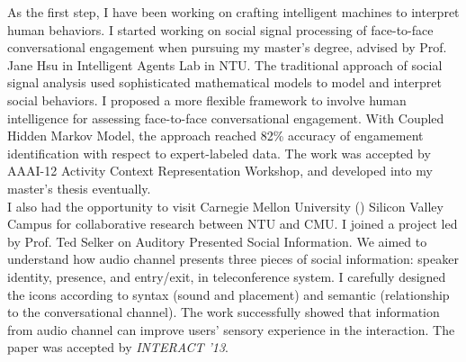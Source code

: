 \noindent
As the first step, 
I have been working on crafting intelligent machines to interpret human behaviors. 
I started working on social signal processing of face-to-face conversational engagement when pursuing my master's degree, 
advised by Prof. Jane Hsu in Intelligent Agents Lab in NTU. 
The traditional approach of social signal analysis used sophisticated mathematical models to model and interpret social behaviors. 
I proposed a more flexible framework to involve human intelligence for assessing face-to-face conversational engagement. 
With Coupled Hidden Markov Model, the approach reached 82\% accuracy of engamement identification with respect to expert-labeled data. 
The work was accepted by AAAI-12 Activity Context Representation Workshop, and developed into my master’s thesis eventually.\\

\noindent
I also had the opportunity to visit Carnegie Mellon University () Silicon Valley Campus for collaborative research between NTU and CMU. 
I joined a project led by Prof. Ted Selker on Auditory Presented Social Information. 
We aimed to understand how audio channel presents three pieces of social information: 
speaker identity, presence, and entry/exit, in teleconference system. 
I carefully designed the icons according to syntax (sound and placement) and semantic (relationship to the conversational channel). 
The work successfully showed that information from audio channel can improve users' sensory experience in the interaction. 
The paper was accepted by \emph{INTERACT '13}. \\





